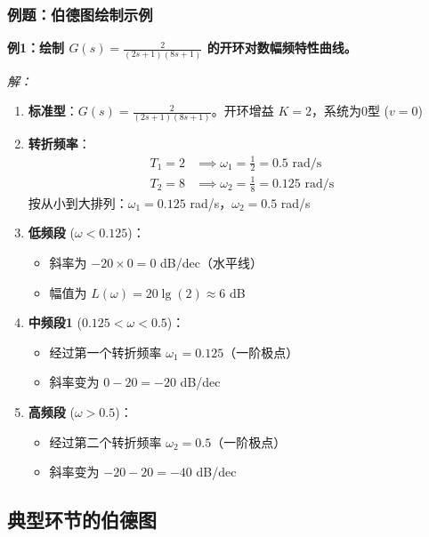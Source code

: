 \subsubsection{例题：伯德图绘制示例}

\textbf{例1：绘制 $G(s) = \frac{2}{(2s+1)(8s+1)}$ 的开环对数幅频特性曲线。}

\textit{解：}
\begin{enumerate}
    \item \textbf{标准型}：$G(s) = \frac{2}{(2s+1)(8s+1)}$。开环增益 $K=2$，系统为0型 ($v=0$)
    
    \item \textbf{转折频率}：
    \begin{align*}
    T_1=2 &\implies \omega_1=\frac{1}{2}=0.5 \text{ rad/s} \\
    T_2=8 &\implies \omega_2=\frac{1}{8}=0.125 \text{ rad/s}
    \end{align*}
    按从小到大排列：$\omega_1 = 0.125$ rad/s，$\omega_2 = 0.5$ rad/s
    
    \item \textbf{低频段} ($\omega < 0.125$)：
    \begin{itemize}
        \item 斜率为 $-20 \times 0 = 0$ dB/dec（水平线）
        \item 幅值为 $L(\omega) = 20\lg(2) \approx 6$ dB
    \end{itemize}
    
    \item \textbf{中频段1} ($0.125 < \omega < 0.5$)：
    \begin{itemize}
        \item 经过第一个转折频率 $\omega_1 = 0.125$（一阶极点）
        \item 斜率变为 $0 - 20 = -20$ dB/dec
    \end{itemize}
    
    \item \textbf{高频段} ($\omega > 0.5$)：
    \begin{itemize}
        \item 经过第二个转折频率 $\omega_2 = 0.5$（一阶极点）
        \item 斜率变为 $-20 - 20 = -40$ dB/dec
    \end{itemize}
\end{enumerate}

\subsection{典型环节的伯德图}

